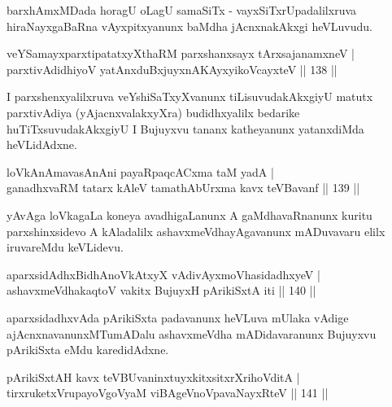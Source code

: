 \begin{artha}
barxhAmxMDada horagU oLagU samaSiTx - vayxSiTxrUpadalilxruva hiraNayxgaBaRna vAyxpitxyanunx baMdha jAcnxnakAkxgi heVLuvudu.
\end{artha}


\begin{shl}
veYSamayxparxtipatatxyXthaRM parxshanxsayx tArxsajanamxneV |\\
parxtivAdidhiyoV yatAnxduBxjuyxnA\s \s KAyxyikoVcayxteV \hfill || 138 ||
\end{shl}

\begin{artha}
I parxshenxyalilxruva veYshiSaTxyXvanunx tiLisuvudakAkxgiyU matutx parxtivAdiya (yAjacnxvalakxyXra) budidhxyalilx bedarike huTiTxsuvudakAkxgiyU I Bujuyxvu tananx katheyanunx yatanxdiMda heVLidAdxne.
\end{artha}

\begin{shl}
loVkAnAmavasAnAni payaRpaqcACxma taM yadA |\\
ganadhxvaRM tatarx kAleV tamathAbUrxma kavx teV\s Bavanf \hfill || 139 ||
\end{shl}

\begin{artha}
yAvAga loVkagaLa koneya avadhigaLanunx A gaMdhavaRnanunx kuritu parxshinxsidevo A kAladalilx ashavxmeVdhayAgavanunx mADuvavaru elilx iruvareMdu keVLidevu.
\end{artha}

\begin{shl}
aparxsidAdhxBidhAnoVkAtxyX vAdivAyxmoVhasidadhxyeV |\\
ashavxmeVdhakaqtoV vakitx BujuyxH pArikiSxtA iti \hfill || 140 ||
\end{shl}

\begin{artha}
aparxsidadhxvAda pArikiSxta padavanunx heVLuva mUlaka vAdige ajAcnxnavanunxMTumADalu ashavxmeVdha mADidavaranunx Bujuyxvu pArikiSxta eMdu karedidAdxne.
\end{artha}


\begin{shl}
pArikiSxtAH kavx teV\s BUvaninxtuyxkitxsitxrXrihoVditA |\\
tirxruketxVrupayoVgoV\s yaM viBAgeVnoVpavaNayxRteV \hfill || 141 ||
\end{shl}

